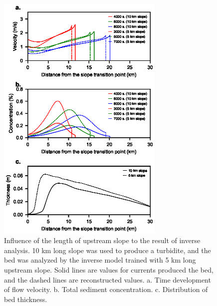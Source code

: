\begin{figure}[t]
  \includegraphics[width=8cm]{fig09_slope.eps}
  \caption{Influence of the length of upstream slope to the result of inverse analysis. 10 km long slope was used to produce a turbidite, and the bed was analyzed by the inverse model trained with 5 km long upstream slope. Solid lines are values for currents produced the bed, and the dashed lines are reconstructed values.  a. Time development of flow velocity. b. Total sediment concentration. c. Distribution of bed thickness.}
 \label{fig:test_slope_length}
\end{figure}


